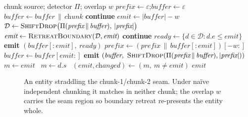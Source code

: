 \documentclass[conference]{IEEEtran}
\begin{document}
\begin{algorithm}[t]
\caption{Overlap-aware streaming redaction $S_w$}
\label{alg:stream}
\begin{algorithmic}[1]
\Require chunk source; detector $\Pi$; overlap $w$
\State $\textit{prefix}\gets\varepsilon$;\quad $\textit{buffer}\gets\varepsilon$
  \State $\textit{buffer}\gets\textit{buffer}\,\|\,\textit{chunk}$
   \textbf{continue} \EndIf
  \State $\textit{emit}\gets|\textit{buffer}|-w$
  \State $\mathcal{D}\gets\textsc{ShiftDrop}\bigl(\Pi(\textit{prefix}\,\|\,\textit{buffer}),\,|\textit{prefix}|\bigr)$
  \State $\textit{emit}\gets\textsc{RetreatBoundary}(\mathcal{D},\textit{emit})$
   \textbf{continue} \EndIf
  \State $\textit{ready}\gets\{d\in\mathcal{D}: d.e\le\textit{emit}\}$
  \State \textbf{emit} $(\textit{buffer}[{:}\textit{emit}],\ \textit{ready})$
  \State $\textit{prefix}\gets(\textit{prefix}\,\|\,\textit{buffer}[{:}\textit{emit}])[-w{:}]$
  \State $\textit{buffer}\gets\textit{buffer}[\textit{emit}{:}]$
\EndFor
{}
  \State \textbf{emit} $(\textit{buffer},\ \textsc{ShiftDrop}(\Pi(\textit{prefix}\,\|\,\textit{buffer}),|\textit{prefix}|))$
\EndIf
\Statex
{}
  \Repeat
    \State $m\gets\textit{emit}$
      \ $m\gets d.s$\ \EndIf
    \EndFor
    \State $(\textit{emit},\textit{changed})\gets(m,\ m\neq\textit{emit})$
  \State \Return $\textit{emit}$
\EndFunction
\end{algorithmic}
\end{algorithm}

\begin{figure}[t]
\centering
{}
\caption{An entity straddling the chunk-1/chunk-2 seam. Under na\"ive independent
chunking it matches in neither chunk; the overlap $w$ carries the seam region so
boundary retreat re-presents the entity whole.}
\label{fig:seam}
\end{figure}
\end{document}

